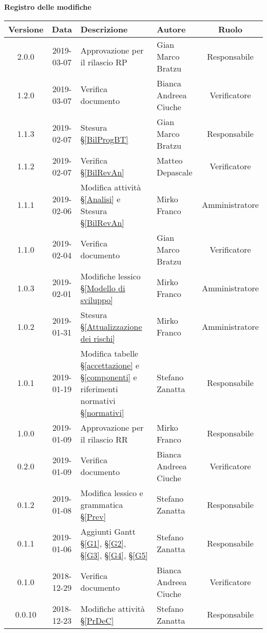 	\begin{center}
		\textbf{Registro delle modifiche}
	\end{center}
	\begin{center}
		\begin{tabularx}{\textwidth}{|c|c|X|X|c|}
			\hline
			\textbf{Versione} & \textbf{Data} & \textbf{Descrizione} & \textbf{Autore} & \textbf{Ruolo} \\
			\hline
			2.0.0 & 2019-03-07 & Approvazione per il rilascio RP & Gian Marco Bratzu & Responsabile \\
			\hline
			1.2.0 & 2019-03-07 & Verifica documento & Bianca Andreea Ciuche & Verificatore \\
			\hline
			1.1.3 & 2019-02-07 & Stesura \S\ref{BilProgBT} & Gian Marco Bratzu & Responsabile \\
			\hline
			1.1.2 & 2019-02-07 & Verifica \S\ref{BilRevAn} & Matteo Depascale & Verificatore \\
			\hline
			1.1.1 & 2019-02-06 & Modifica attività \S\ref{Analisi} e Stesura \S\ref{BilRevAn} & Mirko Franco & Amministratore \\
			\hline
			1.1.0 & 2019-02-04 & Verifica documento & Gian Marco Bratzu & Verificatore\\
			\hline
			1.0.3 & 2019-02-01 & Modifiche lessico \S\ref{Modello di sviluppo} & Mirko Franco & Amministratore \\
			\hline
			1.0.2 & 2019-01-31 & Stesura \S\ref{Attualizzazione dei rischi} & Mirko Franco & Amministratore \\
			\hline
			1.0.1 & 2019-01-19 & Modifica tabelle \S\ref{accettazione} e \S\ref{componenti} e riferimenti normativi \S\ref{normativi} & Stefano Zanatta & Responsabile\\
			\hline
			1.0.0 & 2019-01-09 & Approvazione per il rilascio RR & Mirko Franco & Responsabile\\
			\hline
			0.2.0 & 2019-01-09 & Verifica documento & Bianca Andreea Ciuche& Verificatore\\
			\hline
			0.1.2 & 2019-01-08 & Modifica lessico e grammatica \S\ref{Prev}& Stefano Zanatta & Responsabile\\
			\hline
			0.1.1 & 2019-01-06 & Aggiunti Gantt \S\ref{G1}, \S\ref{G2}, \S\ref{G3}, \S\ref{G4}, \S\ref{G5} & Stefano Zanatta & Responsabile\\
			\hline
			0.1.0 & 2018-12-29 & Verifica documento & Bianca Andreea Ciuche& Verificatore\\
			\hline
			0.0.10 & 2018-12-23 & Modifiche attività \S\ref{PrDeC} & Stefano Zanatta & Responsabile\\

\end{tabularx}
\end{center}
